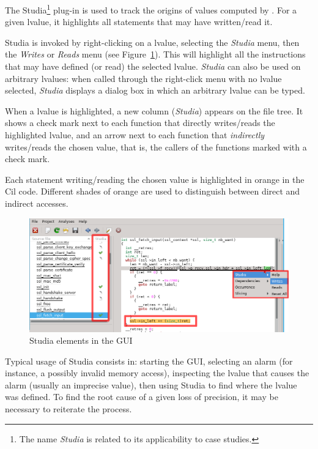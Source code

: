 The Studia\footnote{The name \emph{Studia} is related to its applicability
to case studies.} plug-in is used to track the origins of values computed by \Eva{}.
For a given lvalue, it highlights all statements that may have written/read
it.

Studia is invoked by right-clicking on a lvalue, selecting the \emph{Studia}
menu, then the \emph{Writes} or \emph{Reads} menu (see Figure~\ref{fig:studia}).
This will highlight all the instructions that may have defined (or read)
the selected lvalue.
\emph{Studia} can also be used on arbitrary lvalues: when called through
the right-click menu with no lvalue selected, \emph{Studia} displays a
dialog box in which an arbitrary lvalue can be typed.

When a lvalue is highlighted, a new column (\emph{Studia}) appears on the
file tree. It shows a check mark next to each function that directly
writes/reads the highlighted lvalue, and an arrow next to each function
that \emph{indirectly} writes/reads the chosen value, that is, the callers of the
functions marked with a check mark.

Each statement writing/reading the chosen value is highlighted in orange in the
Cil code. Different shades of orange are used to distinguish between direct and
indirect accesses.

\begin{figure}[h!]
  \caption{\label{fig:studia}Studia elements in the GUI}
  \centering
    \includegraphics[width=\textwidth]{gui-images/studia}
\end{figure}

Typical usage of Studia consists in: starting the GUI, selecting an alarm
(for instance, a possibly invalid memory access), inspecting the lvalue
that causes the alarm (usually an imprecise value), then using Studia to find
where the lvalue was defined. To find the root cause of a given loss of
precision, it may be necessary to reiterate the process.

